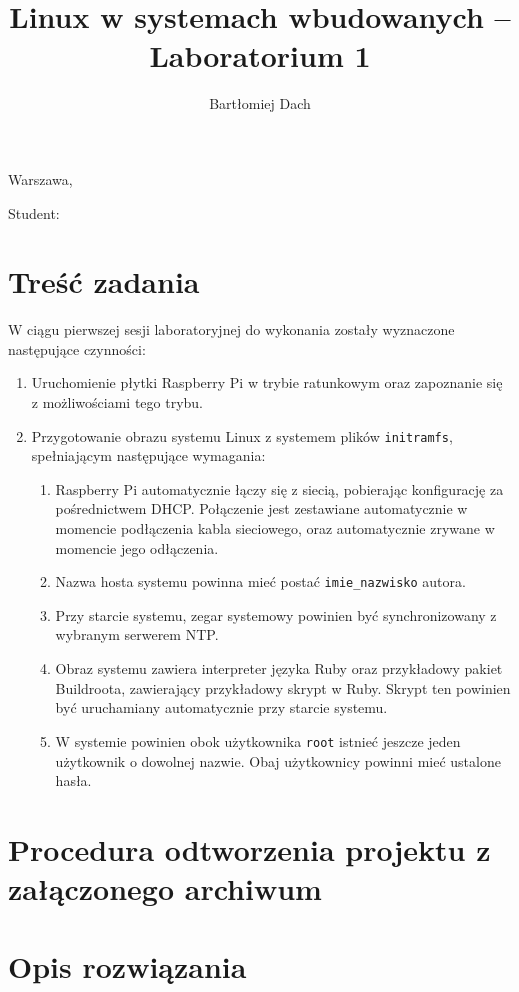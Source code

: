 \documentclass[10pt,a4paper]{article}
\title{Linux w systemach wbudowanych -- Laboratorium 1}
\author{Bartłomiej Dach}
\begin{document}
\makeatletter
\begin{flushright}
	Warszawa, \@date
\end{flushright}
\begin{center}
	\LARGE{\@title}
\end{center}
\vspace{0.25cm}
Student: \@author
\makeatother

\section{Treść zadania}

W ciągu pierwszej sesji laboratoryjnej do wykonania zostały wyznaczone następujące czynności:

\begin{enumerate}
	\item Uruchomienie płytki Raspberry Pi w trybie ratunkowym oraz zapoznanie się z możliwościami tego trybu.
	\item Przygotowanie obrazu systemu Linux z systemem plików \verb+initramfs+, spełniającym następujące wymagania:
	\begin{enumerate}
		\item Raspberry Pi automatycznie łączy się z siecią, pobierając konfigurację za pośrednictwem DHCP.
			Połączenie jest zestawiane automatycznie w momencie podłączenia kabla sieciowego, oraz automatycznie
			zrywane w momencie jego odłączenia.
		\item Nazwa hosta systemu powinna mieć postać \verb+imie_nazwisko+ autora.
		\item Przy starcie systemu, zegar systemowy powinien być synchronizowany z wybranym serwerem NTP.
		\item Obraz systemu zawiera interpreter języka Ruby oraz przykładowy pakiet Buildroota, zawierający przykładowy
			skrypt w Ruby. Skrypt ten powinien być uruchamiany automatycznie przy starcie systemu.
		\item W systemie powinien obok użytkownika \verb+root+ istnieć jeszcze jeden użytkownik o dowolnej nazwie.
			Obaj użytkownicy powinni mieć ustalone hasła.
	\end{enumerate}
\end{enumerate}

\section{Procedura odtworzenia projektu z załączonego archiwum}

\section{Opis rozwiązania}
\end{document}
